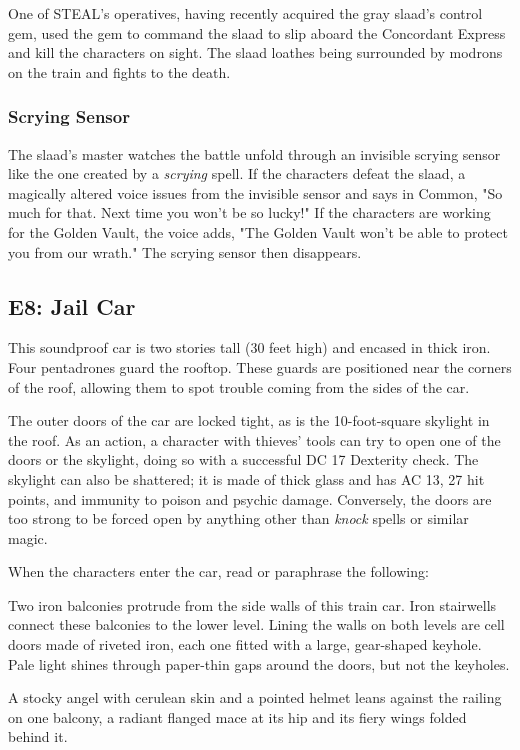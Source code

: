 \documentclass[10pt,a4paper,twoside,bg=print,twocolumn,openany,nodeprecatedcode]{dndbook}
\begin{document}
One of STEAL's operatives, having recently acquired the gray slaad's control gem, used the gem to command the slaad to slip aboard the Concordant Express and kill the characters on sight. The slaad loathes being surrounded by modrons on the train and fights to the death.

\subsubsection{Scrying Sensor}
The slaad's master watches the battle unfold through an invisible scrying sensor like the one created by a \textit{scrying} spell. If the characters defeat the slaad, a magically altered voice issues from the invisible sensor and says in Common, "So much for that. Next time you won't be so lucky!" If the characters are working for the Golden Vault, the voice adds, "The Golden Vault won't be able to protect you from our wrath." The scrying sensor then disappears.

\subsection{E8: Jail Car}
This soundproof car is two stories tall (30 feet high) and encased in thick iron. Four pentadrones guard the rooftop. These guards are positioned near the corners of the roof, allowing them to spot trouble coming from the sides of the car.

The outer doors of the car are locked tight, as is the 10-foot-square skylight in the roof. As an action, a character with thieves' tools can try to open one of the doors or the skylight, doing so with a successful DC 17 Dexterity check. The skylight can also be shattered; it is made of thick glass and has AC 13, 27 hit points, and immunity to poison and psychic damage. Conversely, the doors are too strong to be forced open by anything other than \textit{knock} spells or similar magic.

When the characters enter the car, read or paraphrase the following:

\begin{DndReadAloud}{}
Two iron balconies protrude from the side walls of this train car. Iron stairwells connect these balconies to the lower level. Lining the walls on both levels are cell doors made of riveted iron, each one fitted with a large, gear-shaped keyhole. Pale light shines through paper-thin gaps around the doors, but not the keyholes.

A stocky angel with cerulean skin and a pointed helmet leans against the railing on one balcony, a radiant flanged mace at its hip and its fiery wings folded behind it.

\end{DndReadAloud}
\end{document}

